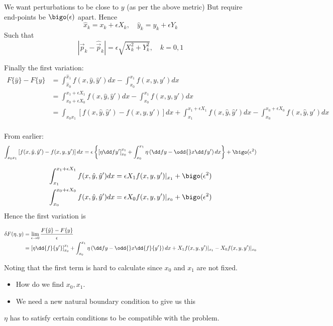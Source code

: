 \documentclass{E:/Documents/Latex/myassignment}
\begin{document}
We want perturbations to be close to $y$ (as per the above metric) But require end-points be $\bigo(\epsilon)$ apart. Hence
\[\hat{x}_k = x_k + \epsilon X_k, \quad \hat{y}_k = y_k + \epsilon Y_k\]
Such that
\[|\vec p_k - \hat{\vec p}_k| = \epsilon \sqrt{X_k^2 + Y_k^2}, \quad k =0,1\]



Finally the first variation:
\begin{align*}
	F\{\hat y\} - F\{y\} &= \int_{\hat x_0}^{\hat x_1} f(x,\hat{y},\hat{y}') dx - \int_{x_0}^{x_1} f(x,y,y') dx\\
	&= \int_{x_0 + \epsilon X_0}^{x_1 + \epsilon X_1} f(x,\hat{y},\hat{y}') dx - \int_{x_0}^{x_1} f(x,y,y') dx\\
	&= \int_{x_0 x_1} \left[f(x,\hat{y},\hat{y}') - f(x,y,y')\right] dx + \int_{x_1}^{x_1+ \epsilon X_1} f(x,\hat{y},\hat{y}') dx - \int_{x_0}^{x_0 + \epsilon X_0} f(x,\hat{y},\hat{y}') dx\\
\end{align*}

From earlier:
\[\int_{x_0 x_1} \left[f(x,\hat{y},\hat{y}') - f(x,y,y')\right] dx = \epsilon \left\{\left[\eta \dd f{y'}\right]_{x_0}^{x_1} + \int_{x_0}^{x_1} \eta\left(\dd fy - \odd{}x \dd f{y'}\right) dx\right\} + \bigo(\epsilon^2)\]

\begin{align*}
	\int_{x_1}^{x_1+ \epsilon X_1} f(x,\hat{y},\hat{y}') dx  &= \epsilon X_1 f(x,y,y')|_{x_1} + \bigo(\epsilon^2)\\
	\int_{x_0}^{x_0 + \epsilon X_0} f(x,\hat{y},\hat{y}') dx &= \epsilon X_0 f(x,y,y') |_{x_0} + \bigo(\epsilon^2)
\end{align*}
Hence the first variation is

\begin{align*}
	\delta F(\eta,y) &= \lim_{\epsilon \to 0} \frac{F\{\hat{y}\} - F\{y\}}{\epsilon}\\
	&= \left[\eta \dd {f}{y'}\right]_{x_0}^{x_1} + \int_{x_0}^{x_1} \eta \left(\dd fy - \odd{}x \dd {f}{y'}\right) dx + X_1 f(x,y,y')|_{x_1} - X_0 f(x,y,y')|_{x_0}
\end{align*}

Noting that the first term is hard to calculate since $x_0$ and $x_1$ are not fixed.
\begin{itemize}
	\item How do we find $x_0,x_1$.
	\item We need a new natural boundary condition to give us this
\end{itemize}
$\eta$ has to satisfy certain conditions to be compatible with the problem.
\end{document}
